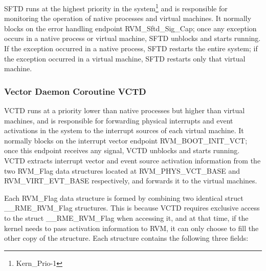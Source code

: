 SFTD runs at the highest priority in the system\footnote{Kern\_Prio-1} and is responsible for monitoring the operation of native processes and virtual machines. It normally blocks on the error handling endpoint RVM\_Sftd\_Sig\_Cap; once any exception occurs in a native process or virtual machine, SFTD unblocks and starts running. If the exception occurred in a native process, SFTD restarts the entire system; if the exception occurred in a virtual machine, SFTD restarts only that virtual machine.

\subsubsection{Vector Daemon Coroutine VCTD}\label{subsubsec:2-1-2-3}

VCTD runs at a priority lower than native processes but higher than virtual machines, and is responsible for forwarding physical interrupts and event activations in the system to the interrupt sources of each virtual machine. It normally blocks on the interrupt vector endpoint RVM\_BOOT\_INIT\_VCT; once this endpoint receives any signal, VCTD unblocks and starts running. VCTD extracts interrupt vector and event source activation information from the two RVM\_Flag data structures located at RVM\_PHYS\_VCT\_BASE and RVM\_VIRT\_EVT\_BASE respectively, and forwards it to the virtual machines.

Each RVM\_Flag data structure is formed by combining two identical struct
\_\_RME\_RVM\_Flag structures. This is because VCTD requires exclusive access to the struct
\_\_RME\_RVM\_Flag when accessing it, and at that time, if the kernel needs to pass activation information to RVM, it can only choose to fill the other copy of the structure. Each structure contains the following three fields:

